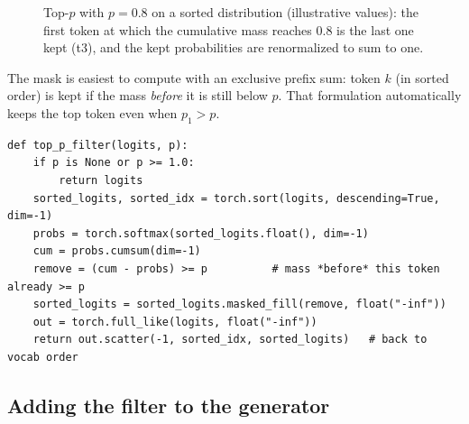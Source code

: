 \begin{figure}[t]
\centering
{}
\caption{Top-$p$ with $p = 0.8$ on a sorted distribution (illustrative values): the first token at
which the cumulative mass reaches $0.8$ is the last one kept (t3), and the kept probabilities are
renormalized to sum to one.}
\label{fig:scaling:topp}
\end{figure}

The mask is easiest to compute with an exclusive prefix sum: token $k$ (in sorted order) is kept
if the mass \emph{before} it is still below $p$. That formulation automatically keeps the top token
even when $p_1 > p$.

\begin{lstlisting}[caption={Top-$p$ filter on logits (\texttt{llmsys/generate.py}).},label={lst:scaling:topp}]
def top_p_filter(logits, p):
    if p is None or p >= 1.0:
        return logits
    sorted_logits, sorted_idx = torch.sort(logits, descending=True, dim=-1)
    probs = torch.softmax(sorted_logits.float(), dim=-1)
    cum = probs.cumsum(dim=-1)
    remove = (cum - probs) >= p          # mass *before* this token already >= p
    sorted_logits = sorted_logits.masked_fill(remove, float("-inf"))
    out = torch.full_like(logits, float("-inf"))
    return out.scatter(-1, sorted_idx, sorted_logits)   # back to vocab order
\end{lstlisting}

\subsection{Adding the filter to the generator}\label{sec:scaling:addtopp}

